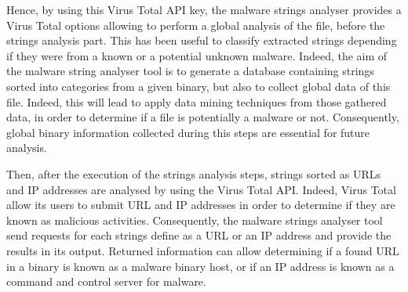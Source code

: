 Hence, by using this Virus Total API key, the malware strings analyser provides a Virus Total
options allowing to perform a global analysis of the file, before the strings analysis part.
This has been useful to classify extracted strings depending if they were from a known or a 
potential unknown malware.
Indeed, the aim of the malware string analyser tool is to generate a database containing 
strings sorted into categories from a given binary, but also to collect global data of this file.
Indeed, this will lead to apply data mining techniques from those gathered data, in order to
determine if a file is potentially a malware or not. Consequently, global binary information
collected during this steps are essential for future analysis.

Then, after the execution of the strings analysis steps, strings sorted as URLs and IP addresses
are analysed by using the Virus Total API. Indeed, Virus Total allow its users to submit
URL and IP addresses in order to determine if they are known as malicious activities.
Consequently, the malware strings analyser tool send requests for each strings define
as a URL or an IP address and provide the results in its output.
Returned information can allow determining if a found URL in a binary is known as a malware
binary host, or if an IP address is known as a command and control server for malware.
